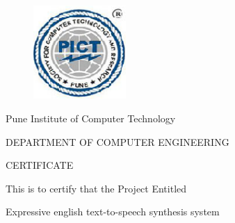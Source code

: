 \documentclass[oneside,a4paper,12pt]{book}
\begin{document}
\newpage



\begin{figure}[ht]
\centering
\includegraphics[width=100pt]{collegelogo.png}
\end{figure}


{\bfseries \fontsize{14}{12} \selectfont \centerline{Pune Institute of Computer Technology}
\centerline{DEPARTMENT OF COMPUTER ENGINEERING}
\vspace*{2\baselineskip}} 


{\bfseries \fontsize{16}{12} \selectfont \centerline{CERTIFICATE} 
\vspace*{2\baselineskip}} 

\centerline{This is to certify that the Project Entitled}
\vspace*{.5\baselineskip} 


{\bfseries \fontsize{14}{12} \selectfont \centerline{ Expressive english text-to-speech synthesis system}
\vspace*{0.5\baselineskip}}
\end{document}
